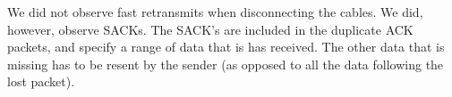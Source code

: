 We did not observe fast retransmits when disconnecting the cables. We did, however, observe SACKs. The SACK's are included in the duplicate ACK packets, and specify a range of data that is has received. The other data that is missing has to be resent by the sender (as opposed to all the data following the lost packet).
